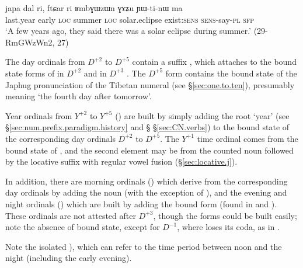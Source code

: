 \begin{exe}
\ex \label{ex:japa.dal.ri}
\gll japa dal ri, ftɕar ri  ʁmbɣɯzɯn ɣɤʑu ɲɯ-ti-nɯ ma \\
 last.year early \textsc{loc} summer \textsc{loc} solar.eclipse exist:\textsc{sens} \textsc{sens}-say-\textsc{pl} \textsc{sfp}\\
\glt `A few years ago, they said there was a solar eclipse during summer.' (29-RmGWzWn2, 27)
\end{exe}

The day ordinals from $D^{+2}$ to $D^{+5}$ contain a suffix , which attaches to the bound state forms of  in $D^{+2}$  and  in $D^{+3}$ . The $D^{+5}$ form  contains the bound state  of the Japhug pronunciation  of the Tibetan numeral   (see §\ref{sec:one.to.ten}), presumably meaning `the fourth day after tomorrow'.

Year ordinals from $Y^{+2}$ to $Y^{+5}$ () are built by simply adding the root  `year' (see §\ref{sec:num.prefix.paradigm.history} and § §\ref{sec:CN.verbs}) to the bound state of the corresponding day ordinals $D^{+2}$ to $D^{+5}$. The $Y^{+1}$ time ordinal  comes from the bound state of  , and the second element may be from the counted noun  followed by the locative suffix  with regular vowel fusion (§\ref{sec:locative.j}).

In addition, there are morning ordinals () which derive from the corresponding day ordinals by adding the noun  (with the exception of ), and the evening and night ordinals () which are built by adding the bound form  (found in  and ). These ordinals are not attested after $D^{+3}$, though the forms could be built easily; note the absence of bound state, except for $D^{-1}$, where  loses its coda, as in .

Note the isolated  ), which can refer to the time period between noon and the night (including the early evening). 

